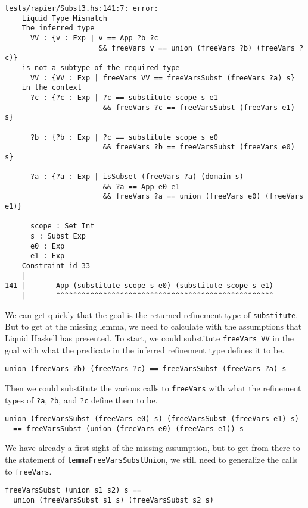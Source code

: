 \documentclass[sigconf, anonymous, review]{acmart}
\newcommand{\tc}[1]{{\small\texttt{#1}}}
\begin{document}
\begin{verbatim}
tests/rapier/Subst3.hs:141:7: error:
    Liquid Type Mismatch
    The inferred type
      VV : {v : Exp | v == App ?b ?c
                      && freeVars v == union (freeVars ?b) (freeVars ?c)}
    is not a subtype of the required type
      VV : {VV : Exp | freeVars VV == freeVarsSubst (freeVars ?a) s}
    in the context
      ?c : {?c : Exp | ?c == substitute scope s e1
                       && freeVars ?c == freeVarsSubst (freeVars e1) s}

      ?b : {?b : Exp | ?c == substitute scope s e0
                       && freeVars ?b == freeVarsSubst (freeVars e0) s}

      ?a : {?a : Exp | isSubset (freeVars ?a) (domain s)
                       && ?a == App e0 e1
                       && freeVars ?a == union (freeVars e0) (freeVars e1)}

      scope : Set Int
      s : Subst Exp
      e0 : Exp
      e1 : Exp
    Constraint id 33
    |
141 |       App (substitute scope s e0) (substitute scope s e1)
    |       ^^^^^^^^^^^^^^^^^^^^^^^^^^^^^^^^^^^^^^^^^^^^^^^^^^^
\end{verbatim}

We can get quickly that the goal is the returned refinement type of \tc{substitute}.
But to get at the missing lemma, we need to calculate with the assumptions that
Liquid Haskell has presented.
To start, we could substitute \tc{freeVars VV} in the goal with what the predicate
in the inferred refinement type defines it to be.

\begin{verbatim}
union (freeVars ?b) (freeVars ?c) == freeVarsSubst (freeVars ?a) s
\end{verbatim}

Then we could substitute the various calls to \tc{freeVars} with what
the refinement types of \tc{?a}, \tc{?b}, and \tc{?c} define them to be.

\begin{verbatim}
union (freeVarsSubst (freeVars e0) s) (freeVarsSubst (freeVars e1) s)
  == freeVarsSubst (union (freeVars e0) (freeVars e1)) s
\end{verbatim}

We have already a first sight of the missing assumption, but to get from
there to the statement of \tc{lemmaFreeVarsSubstUnion}, we still need
to generalize the calls to \tc{freeVars}.

\begin{verbatim}
freeVarsSubst (union s1 s2) s ==
  union (freeVarsSubst s1 s) (freeVarsSubst s2 s)
\end{verbatim}
\end{document}
